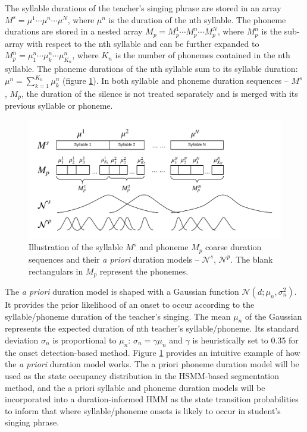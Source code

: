 The syllable durations of the teacher's singing phrase are stored in an array $M^s=\mu^{1} \cdots \mu^{n} \cdots \mu^{N}$, where $\mu^{n}$ is the duration of the nth syllable. The phoneme durations are stored in a nested array $M_p=M^{1}_p \cdots M^{n}_p \cdots M^{N}_p$, where $M^{n}_p$ is the sub-array with respect to the nth syllable and can be further expanded to $M^{n}_p=\mu_{1}^{n} \cdots \mu_{k}^{n} \cdots \mu_{K_{n}}^{n}$, where $K_{n}$ is the number of phonemes contained in the nth syllable. The phoneme durations of the nth syllable sum to its syllable duration: $\mu^{n}=\sum_{k=1}^{K_{n}} \mu_k^{n}$ (figure \ref{fig:coarse_dur}). In both syllable and phoneme duration sequences -- $M^s$, $M_p$, the duration of the silence is not treated separately and is merged with its previous syllable or phoneme.

\begin{figure}[ht!]
    \centering
    \includegraphics[width=\textwidth]{figs/blockDiags_rong/ch5_coarse_durations_segmentation.png}
    \caption{Illustration of the syllable $M^s$ and phoneme $M_p$ coarse duration sequences and their \textit{a priori} duration models -- $\mathcal{N}^s$, $\mathcal{N}^p$. The blank rectangulars in $M_p$ represent the phonemes.}
    \label{fig:coarse_dur}
\end{figure}

The \textit{a priori} duration model is shaped with a Gaussian function $\mathcal{N} (d; {\mu}_n, \sigma_n^2)$. It provides the prior likelihood of an onset to occur according to the syllable/phoneme duration of the teacher's singing. The mean ${\mu}_n$ of the Gaussian represents the expected duration of nth teacher's syllable/phoneme. Its standard deviation $\sigma_n$ is proportional to $\mu_n$: $\sigma_n=\gamma \mu_n$ and $\gamma$ is heuristically set to 0.35 for the onset detection-based method. Figure \ref{fig:coarse_dur} provides an intuitive example of how the \textit{a priori} duration model works. The a priori phoneme duration model will be used as the state occupancy distribution in the HSMM-based segmentation method, and the a priori syllable and phoneme duration models will be incorporated into a duration-informed HMM as the state transition probabilities to inform that where syllable/phoneme onsets is likely to occur in student's singing phrase.


